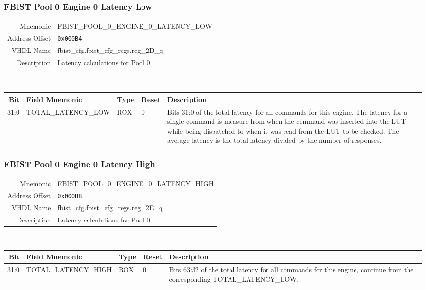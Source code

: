 \subsubsection{FBIST Pool 0 Engine 0 Latency Low}
\begin{tabular}{ r | p{350px} }
  Mnemonic       & FBIST\_POOL\_0\_ENGINE\_0\_LATENCY\_LOW \\
  Address Offset & \texttt{0x000B4}                        \\
  VHDL Name      &  fbist\_cfg.fbist\_cfg\_regs.reg\_2D\_q \\ \hline

  Description &
  Latency calculations for Pool 0. \\
\end{tabular}
\\
\begin{tabularx}{\textwidth}{r|l|l|l|X}
  \hline
  Bit   & Field Mnemonic      & Type & Reset & Description \\ \hline

  31:0  & TOTAL\_LATENCY\_LOW & ROX  & 0     &

  Bits 31:0 of the total latency for all commands for this engine. The
  latency for a single command is measure from when the command was
  inserted into the LUT while being dispatched to when it was read
  from the LUT to be checked. The average latency is the total latency
  divided by the number of responses. \\
\end{tabularx}

\subsubsection{FBIST Pool 0 Engine 0 Latency High}
\begin{tabular}{ r | p{350px} }
  Mnemonic       & FBIST\_POOL\_0\_ENGINE\_0\_LATENCY\_HIGH \\
  Address Offset & \texttt{0x000B8}                         \\
  VHDL Name      &  fbist\_cfg.fbist\_cfg\_regs.reg\_2E\_q  \\ \hline

  Description &
  Latency calculations for Pool 0. \\
\end{tabular}
\\
\begin{tabularx}{\textwidth}{r|l|l|l|X}
  \hline
  Bit   & Field Mnemonic       & Type & Reset & Description \\ \hline

  31:0  & TOTAL\_LATENCY\_HIGH & ROX  & 0     &

  Bits 63:32 of the total latency for all commands for this engine,
  continue from the corresponding TOTAL\_LATENCY\_LOW. \\
\end{tabularx}

